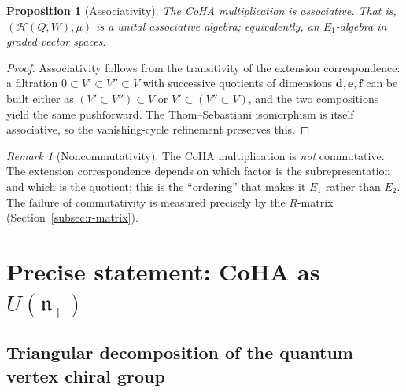 \documentclass[11pt]{article}
\newtheorem{proposition}[theorem]{Proposition}
\theoremstyle{definition}
\theoremstyle{remark}
\newtheorem{remark}[theorem]{Remark}
\newcommand{\CoHA}{\mathcal{H}}
\newcommand{\frakn}{\mathfrak{n}}
\begin{document}
\begin{proposition}[Associativity]
\label{prop:coha-assoc}
The CoHA multiplication is associative. That is, $(\CoHA(Q,W), \mu)$ is a
unital associative algebra; equivalently, an $E_1$-algebra in graded vector spaces.
\end{proposition}

\begin{proof}
Associativity follows from the transitivity of the extension correspondence:
a filtration $0 \subset V' \subset V'' \subset V$ with successive quotients
of dimensions $\mathbf{d}, \mathbf{e}, \mathbf{f}$ can be built either as
$(V' \subset V'') \subset V$ or $V' \subset (V'' \subset V)$, and the two
compositions yield the same pushforward. The Thom--Sebastiani isomorphism
is itself associative, so the vanishing-cycle refinement preserves this.
\end{proof}

\begin{remark}[Noncommutativity]
\label{rem:noncomm}
The CoHA multiplication is \emph{not} commutative. The extension correspondence
depends on which factor is the subrepresentation and which is the quotient;
this is the ``ordering'' that makes it $E_1$ rather than $E_2$. The failure
of commutativity is measured precisely by the $R$-matrix (Section~\ref{subsec:r-matrix}).
\end{remark}


\section{Precise statement: CoHA as $U(\frakn_+)$}
\label{sec:precise-statement}

\subsection{Triangular decomposition of the quantum vertex chiral group}
\label{subsec:triangular}
\end{document}
